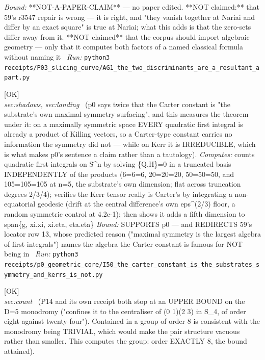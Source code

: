 \begin{description}
 \emph{Bound:} **NOT-A-PAPER-CLAIM** --- no paper edited. **NOT claimed:** that 59's r3547 repair is wrong --- it is right, and "they vanish together at Nariai and differ by an exact square" is true at Nariai; what this adds is that the zero-sets differ away from it. **NOT claimed** that the corpus should import algebraic geometry --- only that it computes both factors of a named classical formula without naming it
\ \emph{Run:} \texttt{python3 receipts/P03\_slicing\_curve/AG1\_the\_two\_discriminants\_are\_a\_resultant\_apart.py}
\item[\label{rcpt:I50_the_carter_constant_is_the_substrates_symmetry_and_kerrs_is_not}\texttt{I50\_the\_carter\_constant\_is\_the\_substrates\_symmetry\_and\_kerrs\_is\_not}]\hfill\textsf{[OK]}\\
\textit{sec:shadows, sec:landing} \ (p0 says twice that the Carter constant is "the substrate's own maximal symmetry surfacing", and this measures the theorem under it: on a maximally symmetric space EVERY quadratic first integral is already a product of Killing vectors, so a Carter-type constant carries no information the symmetry did not --- while on Kerr it is IRREDUCIBLE, which is what makes p0's sentence a claim rather than a tautology). 
\emph{Computes:} counts quadratic first integrals on S\textasciicircum{}n by solving \{Q,H\}=0 in a truncated basis INDEPENDENTLY of the products (6=6=6, 20=20=20, 50=50=50, and 105=105=105 at n=5, the substrate's own dimension; flat across truncation degrees 2/3/4); verifies the Kerr tensor really is Carter's by integrating a non-equatorial geodesic (drift at the central difference's own eps\textasciicircum{}(2/3) floor, a random symmetric control at 4.2e-1); then shows it adds a fifth dimension to span\{g, xi.xi, xi.eta, eta.eta\}
 \emph{Bound:} SUPPORTS p0 --- and REDIRECTS 59's locator row 13, whose predicted reason ("maximal symmetry is the largest algebra of first integrals") names the algebra the Carter constant is famous for NOT being in
\ \emph{Run:} \texttt{python3 receipts/p0\_geometric\_core/I50\_the\_carter\_constant\_is\_the\_substrates\_symmetry\_and\_kerrs\_is\_not.py}
\item[\label{rcpt:I51_the_monodromy_bound_is_attained_and_the_four_dimensional_contrast_is_real}\texttt{I51\_the\_monodromy\_bound\_is\_attained\_and\_the\_four\_dimensional\_contrast\_is\_real}]\hfill\textsf{[OK]}\\
\textit{sec:count} \ (P14 and its own receipt both stop at an UPPER BOUND on the D=5 monodromy ("confines it to the centraliser of (0 1)(2 3) in S\_4, of order eight against twenty-four"). Contained in a group of order 8 is consistent with the monodromy being TRIVIAL, which would make the pair structure vacuous rather than smaller. This computes the group: order EXACTLY 8, the bound attained). 

\end{description}
